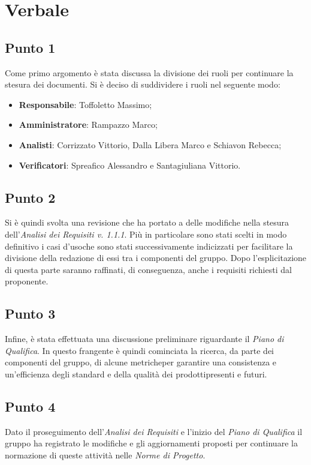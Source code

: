 \section{Verbale}
    \subsection{Punto 1}
        Come primo argomento è stata discussa la divisione dei ruoli per continuare la stesura dei documenti. Si è deciso di suddividere i ruoli nel seguente modo:
        \begin{itemize}
            \item \textbf{Responsabile}: Toffoletto Massimo;
            \item \textbf{Amministratore}: Rampazzo Marco;
            \item \textbf{Analisti}: Corrizzato Vittorio, Dalla Libera Marco e Schiavon Rebecca;
            \item \textbf{Verificatori}: Spreafico Alessandro e Santagiuliana Vittorio. 
        \end{itemize}
    \subsection{Punto 2}
        Si è quindi svolta una revisione che ha portato a delle modifiche nella stesura dell'\textit{Analisi dei Requisiti v. 1.1.1}. Più in particolare sono stati scelti in modo definitivo i casi d'uso\glosp che sono stati successivamente indicizzati per facilitare la divisione della redazione di essi tra i componenti del gruppo. Dopo l'esplicitazione di questa parte saranno raffinati, di conseguenza, anche i requisiti richiesti dal proponente.
    \subsection{Punto 3}
        Infine, è stata effettuata una discussione preliminare riguardante il \textit{Piano di Qualifica}. In questo frangente è quindi cominciata la ricerca, da parte dei componenti del gruppo, di alcune metriche\glosp per garantire una consistenza e un'efficienza degli standard e della qualità dei prodotti\glosp presenti e futuri.
    \subsection{Punto 4}
        Dato il proseguimento dell'\textit{Analisi dei Requisiti} e l'inizio del \textit{Piano di Qualifica} il gruppo ha registrato le modifiche e gli aggiornamenti proposti per continuare la normazione di queste attività nelle \textit{Norme di Progetto}.
